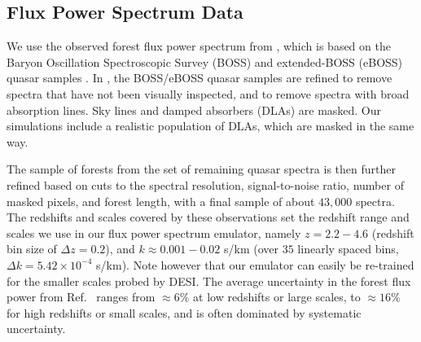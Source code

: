 \subsection{Flux Power Spectrum Data}
\label{sec:fpsdata}

We use the observed \lya forest flux power spectrum from \cite{2019JCAP...07..017C}, which is based on the Baryon Oscillation Spectroscopic Survey (BOSS) and extended-BOSS (eBOSS) quasar samples \cite{2013AJ....145...10D, 2016AJ....151...44D}.
In \cite{2019JCAP...07..017C}, the BOSS/eBOSS quasar samples are refined to remove spectra that have not been visually inspected, and to remove spectra with broad absorption lines.
Sky lines and damped \lya absorbers (DLAs) are masked. Our simulations include a realistic population of DLAs, which are masked in the same way.

The sample of \lya forests from the set of remaining quasar spectra is then further refined based on cuts to the spectral resolution, signal-to-noise ratio, number of masked pixels, and forest length, with a final sample of about $43,000$ spectra.
The redshifts and scales covered by these observations set the redshift range and scales we use in our flux power spectrum emulator, namely $z=2.2-4.6$ (redshift bin size of $\Delta z = 0.2$), and $k\approx0.001-0.02$ s/km (over $35$ linearly spaced bins, $\Delta k = 5.42\times10^{-4}$ s/km). Note however that our emulator can easily be re-trained for the smaller scales probed by DESI.
The average uncertainty in the \lya forest flux power from Ref.~\cite{2019JCAP...07..017C} ranges from $\approx6\%$ at low redshifts or large scales, to $\approx16\%$ for high redshifts or small scales, and is often dominated by systematic uncertainty.

